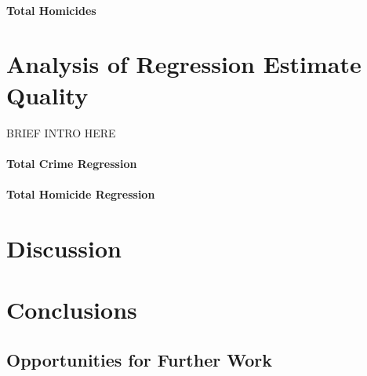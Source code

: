 \documentclass[12pt]{article}
\begin{document}
\paragraph{Total Homicides}











	\section{Analysis of Regression Estimate Quality}
	
BRIEF INTRO HERE

	\paragraph{Total Crime Regression}

	\paragraph{Total Homicide Regression}



	\section{Discussion}



	\section{Conclusions}


\subsection{Opportunities for Further Work}
\end{document}
